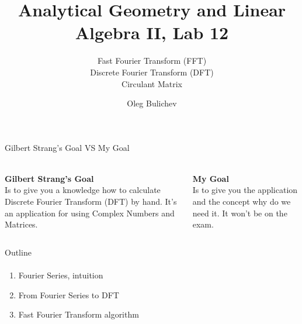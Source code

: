 \documentclass[aspectratio=169]{beamer}
\title[AGLA2]{Analytical Geometry and Linear Algebra II, Lab 12} %
\subtitle{Fast Fourier Transform (FFT) \\ Discrete Fourier Transform (DFT) \\ Circulant Matrix
         } %
\author{Oleg Bulichev}
\newcommand{\fbckg}[1]{\usebackgroundtemplate{\texttt{[image: \#1]}}}%
\begin{document}
\setlength{\abovedisplayskip}{0pt}
\setlength{\belowdisplayskip}{0pt}
\setlength{\abovedisplayshortskip}{0pt}
\setlength{\belowdisplayshortskip}{0pt}

\fbckg{fibeamer/figs/title_page.png}

\fbckg{fibeamer/figs/common.png}


\begin{frame}[t]{Gilbert Strang's Goal VS My Goal}
\framesubtitle{}
\Large
    \begin{columns}[T,onlytextwidth]
        \begin{column}{0.49\textwidth}
            \textbf{Gilbert Strang's Goal} \\
            Is to give you a knowledge how to calculate Discrete Fourier Transform (DFT) by hand. It's an application for using Complex Numbers and Matrices.
        \end{column}
        \begin{column}{0.49\textwidth}
            \textbf{My Goal} \\ 
            Is to give you the application and the concept why do we need it. It won't be on the exam.
        \end{column}
    \end{columns}
\end{frame}


\begin{frame}[t]{Outline}
\framesubtitle{}
    \Large
    \begin{enumerate}
        \item Fourier Series, intuition
        \item From Fourier Series to DFT
        \item Fast Fourier Transform algorithm
    \end{enumerate}
\end{frame}
\end{document}
